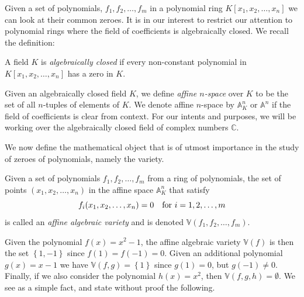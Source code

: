 \documentclass{article}
\newcommand{\C}{\ensuremath{\mathbb{C}}}
\newcommand{\A}{\ensuremath{\mathbb{A}}}
\newcommand{\V}{\ensuremath{\mathbb{V}}}
\begin{document}
    Given a set of polynomials, $f_1, f_2, \ldots, f_m$ in a polynomial ring
    $K[x_1, x_2, \ldots, x_n]$ we can look at their common zeroes. It is in our
    interest to restrict our attention to polynomial rings where the field of
    coefficients is algebraically closed. We recall the definition:

    \begin{definition}
        A field $K$ is \emph{algebraically closed} if every non-constant
        polynomial in $K[x_1, x_2, \ldots, x_n]$ has a zero in $K$.
    \end{definition}
    Given an algebraically closed field $K$, we define \emph{affine
    $n$-space} over $K$ to be the set of all
    $n$-tuples of elements of $K$. We denote affine $n$-space by $\A_K^n$ or
    $\A^n$ if the field of coefficients is clear from context.  For our intents
    and purposes, we will be working over the algebraically closed field of
    complex numbers $\C$. 
    
    We now define the mathematical object that is of utmost importance in the
    study of zeroes of polynomials, namely the variety.
    \begin{definition}
        Given a set of polynomials $f_1, f_2, \ldots, f_m$ from a ring of
        polynomials, the set of points $(x_1, x_2, \ldots, x_n)$ in the affine
        space $\A_K^n$ that satisfy
        \begin{equation}
            \notag
            f_i(x_1, x_2, \ldots, x_n) = 0 \quad \text{for } i = 1, 2, \ldots, m
        \end{equation}
        is called an \emph{affine algebraic variety} and is denoted $\V(f_1,
        f_2, \ldots, f_m)$.
    \end{definition}

    Given the polynomial $f(x) = x^2 - 1$, the affine algebraic variety $\V(f)$
    is then the set $\left\{ 1, -1 \right\}$ since $f(1) = f(-1) = 0$. Given an
    additional polynomial $g(x) = x-1$ we have $\V(f, g) = \left\{ 1 \right\}$
    since $g(1) = 0$, but $g(-1) \neq 0$. Finally, if we also consider the
    polynomial $h(x) = x^2$, then $\V(f, g, h) = \emptyset$. We see as a simple
    fact, and state without proof the following.
    
\end{document}
